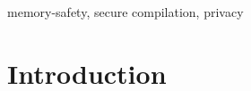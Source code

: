 \documentclass[dvipsnames,conference]{IEEEtran}
\theoremstyle{definition}
\begin{document}
\begin{IEEEkeywords}
  memory-safety, secure compilation, privacy
\end{IEEEkeywords}

\section{Introduction}\label{sec:introduction}


\end{document}
